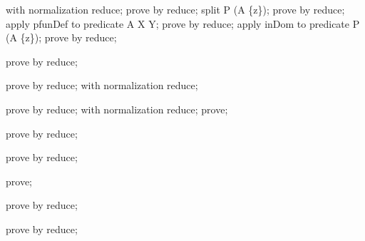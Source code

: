 \begin{zproof}[Teo2]
with normalization reduce;
prove by reduce;
split \lnot  P \in  \dom [X, Y] (A \rres [X, Y] \{z\});
prove by reduce;
apply pfunDef to predicate A \in  X \pfun  Y;
prove by reduce;
apply inDom to predicate P \in  \dom [X, Y] (A \rres [X, Y] \{z\});
prove by reduce;
\end{zproof}

\begin{zproof}
prove by reduce;
\end{zproof}

\begin{zproof}[InvSSP]
prove by reduce;
with normalization reduce;
\end{zproof}

\begin{zproof}[InvSNP]
prove by reduce;
with normalization reduce;
prove;
\end{zproof}

\begin{zproof}[invInit]
prove by reduce;
\end{zproof}

\begin{zproof}
prove by reduce;
\end{zproof}

\begin{zproof}
prove;
\end{zproof}

\begin{zproof}[teO]
prove by reduce;
\end{zproof}

\begin{zproof}[ORTriv]
prove by reduce;
\end{zproof}

